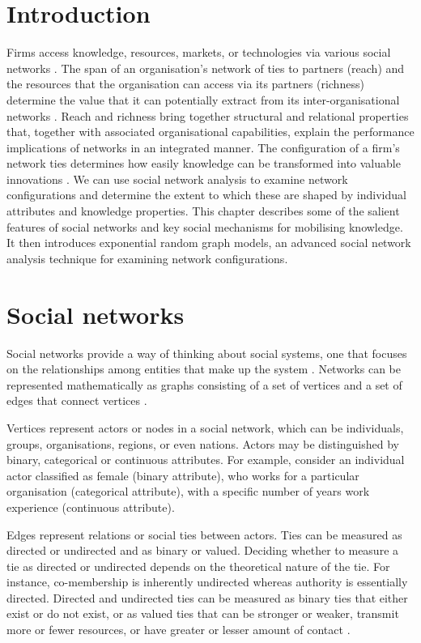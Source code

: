 \section{Introduction}

Firms access knowledge, resources, markets, or technologies via various social networks \citep{inkpen2005social}. The span of an organisation’s network of ties to partners (reach) and the resources that the organisation can access via its partners (richness) determine the value that it can potentially extract from its inter-organisational networks \citep{gulati2011networks}. Reach and richness bring together structural and relational properties that, together with associated organisational capabilities, explain the performance implications of networks in an integrated manner. The configuration of a firm's network ties determines how easily knowledge can be transformed into valuable innovations \citep{tortoriello2010activating}. We can use social network analysis to examine network configurations and determine the extent to which these are shaped by individual attributes and knowledge properties. This chapter describes some of the salient features of social networks and key social mechanisms for mobilising knowledge. It then introduces exponential random graph models, an advanced social network analysis technique for examining network configurations. \medskip  

\section{Social networks}

Social networks provide a way of thinking about social systems, one that focuses on the relationships among entities that make up the system \citep{borgatti2013analyzing,robins2015doing}. Networks can be represented mathematically as graphs consisting of a set of vertices and a set of edges that connect vertices \citep{newman2010networks}. \medskip

Vertices represent actors or nodes in a social network, which can be individuals, groups, organisations, regions, or even nations. Actors may be distinguished by binary, categorical or continuous attributes. For example, consider an individual actor classified as female (binary attribute), who works for a particular organisation (categorical attribute), with a specific number of years work experience (continuous attribute). \medskip

Edges represent relations or social ties between actors. Ties can be measured as directed or undirected and as binary or valued. Deciding whether to measure a tie as directed or undirected depends on the theoretical nature of the tie. For instance, co-membership is inherently undirected whereas authority is essentially directed. Directed and undirected ties can be measured as binary ties that either exist or do not exist, or as valued ties that can be stronger or weaker, transmit more or fewer resources, or have greater or lesser amount of contact \citep{scott2011sage}.\medskip

